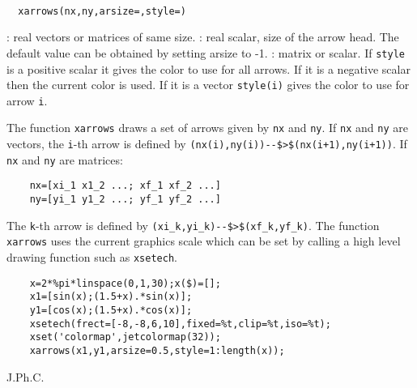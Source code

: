 
\begin{mandesc}
  \\ %
\end{mandesc}
\begin{calling_sequence}
\begin{verbatim}
  xarrows(nx,ny,arsize=,style=)  
\end{verbatim}
\end{calling_sequence}
\begin{parameters}
  \begin{varlist}
    : real vectors or matrices of same size.
    : real scalar, size of the arrow head. The default value can be obtained  by setting arsize to -1.
    : matrix or scalar. If \verb!style! is a positive scalar it
    gives the color to use for all arrows. If it is a negative scalar then the
    current color is used. If it is a vector \verb!style(i)! gives the color to
    use for arrow \verb!i!.
  \end{varlist}
\end{parameters}

\begin{mandescription}
  The function \verb!xarrows! draws a set of arrows given by \verb!nx! and \verb!ny!.
  If \verb!nx! and \verb!ny! are vectors, the \verb!i!-th arrow is defined by
  \verb!(nx(i),ny(i))--$>$(nx(i+1),ny(i+1))!.
  If \verb!nx! and \verb!ny! are matrices:
  \begin{Verbatim}
    nx=[xi_1 x1_2 ...; xf_1 xf_2 ...]
    ny=[yi_1 y1_2 ...; yf_1 yf_2 ...]
  \end{Verbatim}

  The \verb!k!-th arrow is defined by \verb!(xi_k,yi_k)--$>$(xf_k,yf_k)!. 
  The function \verb!xarrows! uses the current graphics scale 
  which can be set by calling a high level drawing function such as \verb!xsetech!.
\end{mandescription}
\begin{examples}
  \begin{Verbatim}
    x=2*%pi*linspace(0,1,30);x($)=[];
    x1=[sin(x);(1.5+x).*sin(x)];
    y1=[cos(x);(1.5+x).*cos(x)];
    xsetech(frect=[-8,-8,6,10],fixed=%t,clip=%t,iso=%t);
    xset('colormap',jetcolormap(32));
    xarrows(x1,y1,arsize=0.5,style=1:length(x));
  \end{Verbatim}
\end{examples}
\begin{authors}
  J.Ph.C.  
\end{authors}

